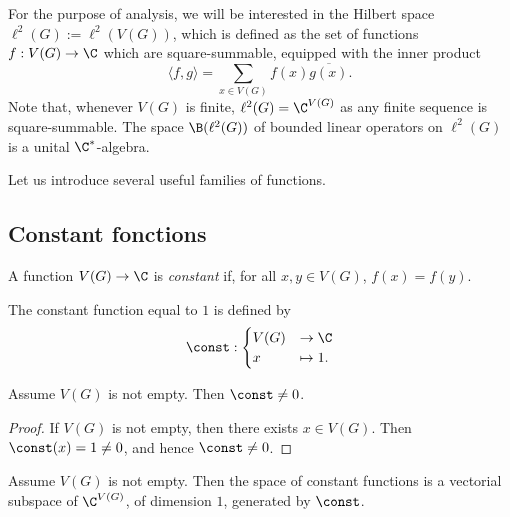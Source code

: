 For the purpose of analysis, we will be interested in the Hilbert space $\ell^2(G) := \ell^2(V(G))$,
which is defined as the set of functions $f : V(G) \rightarrow \C$ which are square-summable,
equipped with the inner product
$$\langle f, g \rangle = \sum_{x \in V(G)} f(x) \overline{g(x)}.$$
Note that, whenever $V(G)$ is finite, $\ell^2(G) = \C^{V(G)}$ as any finite sequence is
square-summable.
The space $\B(\ell^2(G))$ of bounded linear operators on $\ell^2(G)$ is a unital $\C^*$-algebra.

Let us introduce several useful families of functions.

\subsection{Constant fonctions}

\begin{definition}
  \label{def:constant_function}
  A function $V(G) \rightarrow \C$ is \emph{constant} if, for all $x, y \in V(G)$,
  $f(x)=f(y)$.
\end{definition}

\begin{definition}
  \label{def:constant_one}
  The constant function equal to $1$ is defined by
  \begin{equation}
    \const :
    \begin{cases}
      V(G) & \rightarrow \C \\
      x & \mapsto 1.
    \end{cases}
  \end{equation}
\end{definition}

\begin{lemma}
  \label{lem:one_neq_zero}
  Assume $V(G)$ is not empty. Then $\const \neq 0$.
\end{lemma}

\begin{proof}
  If $V(G)$ is not empty, then there exists $x \in V(G)$.
  Then $\const (x) = 1 \neq 0$, and hence $\const \neq 0$.
\end{proof}

\begin{theorem}
  \label{thm:space_constant}
  Assume $V(G)$ is not empty. Then the space of constant functions is
  a vectorial subspace of $\C^{V(G)}$, of dimension $1$, generated by $\const$.
\end{theorem}


